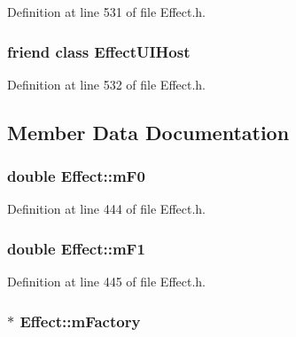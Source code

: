 Definition at line 531 of file Effect.\+h.

\subsubsection[{\texorpdfstring{Effect\+U\+I\+Host}{EffectUIHost}}]{\setlength{\rightskip}{0pt plus 5cm}friend class {\bf Effect\+U\+I\+Host}\hspace{0.3cm}{\ttfamily [friend]}}\hypertarget{class_effect_a951860600bc768dd32035a07a922c593}{}\label{class_effect_a951860600bc768dd32035a07a922c593}


Definition at line 532 of file Effect.\+h.



\subsection{Member Data Documentation}
\subsubsection[{\texorpdfstring{m\+F0}{mF0}}]{\setlength{\rightskip}{0pt plus 5cm}double Effect\+::m\+F0\hspace{0.3cm}{\ttfamily [protected]}}\hypertarget{class_effect_a5518bf74e6a990740b161d6c1e7cfe2d}{}\label{class_effect_a5518bf74e6a990740b161d6c1e7cfe2d}


Definition at line 444 of file Effect.\+h.

\subsubsection[{\texorpdfstring{m\+F1}{mF1}}]{\setlength{\rightskip}{0pt plus 5cm}double Effect\+::m\+F1\hspace{0.3cm}{\ttfamily [protected]}}\hypertarget{class_effect_a195656d6f884aa2b564bb7b6dec392b4}{}\label{class_effect_a195656d6f884aa2b564bb7b6dec392b4}


Definition at line 445 of file Effect.\+h.

\subsubsection[{\texorpdfstring{m\+Factory}{mFactory}}]{$\ast$ Effect\+::m\+Factory\hspace{0.3cm}{\ttfamily [protected]}}\hypertarget{class_effect_a5d51a6ae7955c0a31c6b4df5a17a9f07}{}\label{class_effect_a5d51a6ae7955c0a31c6b4df5a17a9f07}


